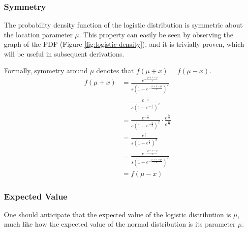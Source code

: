 \documentclass[titlepage,12 pt]{article}
\begin{document}
\subsubsection{Symmetry}

The probability density function of the logistic distribution is symmetric about the location parameter $\mu$.
This property can easily be seen by observing the graph of the PDF (Figure \ref{fig:logistic-density}),
and it is trivially proven, which will be useful in subsequent derivations.

Formally, symmetry around $\mu$ denotes that $f(\mu + x) = f(\mu - x)$.
\begin{align*}
    f(\mu + x) & = \frac{e^{-\frac{\mu + x-\mu}{s}}}{s\left(1 + e^{-\frac{\mu + x-\mu}{s}}\right)^2} \\
               & = \frac{e^{-\frac{x}{s}}}{s\left(1 + e^{-\frac{x}{s}}\right)^2} \\
               & = \frac{e^{-\frac{x}{s}}}{s\left(1 + e^{-\frac{x}{s}}\right)^2} \cdot \frac{e^{\frac{2x}{s}}}{e^{\frac{2x}{s}}} \\
               & = \frac{e^{\frac{x}{s}}}{s\left(1 + e^{\frac{x}{s}}\right)^2} \\
               & = \frac{e^{-\frac{\mu - x - \mu}{s}}}{s\left(1 + e^{-\frac{\mu - x - \mu}{s}}\right)^2} \\
               & = f(\mu - x)
\end{align*}

\subsubsection{Expected Value}

One should anticipate that the expected value of the logistic distribution is $\mu$, much like how the
expected value of the normal distribution is its parameter $\mu$.
\end{document}
